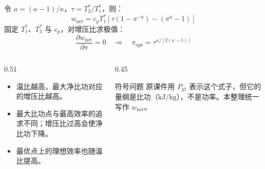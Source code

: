 \begin{frame}[t,shrink]{}
令 \(a=(\kappa-1)/\kappa\)，\(\tau=T_3^*/T_1^*\)，则：
$$
w_{\mathrm{net}}
=c_pT_1^*\left[\tau\left(1-\pi^{-a}\right)-\left(\pi^a-1\right)\right]
$$
固定 \(T_1^*\)、\(T_3^*\) 与 \(c_p\)，对增压比求极值：
$$
\frac{\partial w_{\mathrm{net}}}{\partial\pi}=0
\quad\Rightarrow\quad
\pi_{\mathrm{opt}}=\tau^{\kappa/[2(\kappa-1)]}
$$
\begin{columns}[T,onlytextwidth]
\begin{column}{0.51\textwidth}
  \begin{itemize}
    \item 温比越高，最大净比功对应的增压比越高。
    \item 最大比功点与最高效率的追求不同；增压比过高会使净比功下降。
    \item 最优点上的理想效率也随温比提高。
  \end{itemize}
\end{column}
\begin{column}{0.45\textwidth}
  \begin{amberbox}{符号问题}
  \small 原课件用 \(P_{\mathrm{gt}}\) 表示这个式子，但它的量纲是比功（\(\mathrm{kJ/kg}\)），不是功率。本整理统一写作 \(w_{\mathrm{net}}\)。
  \end{amberbox}
\end{column}
\end{columns}
\end{frame}

